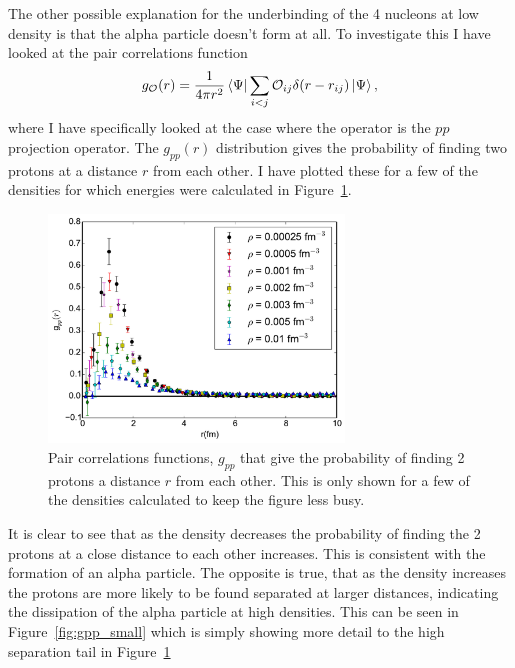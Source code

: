 The other possible explanation for the underbinding of the 4 nucleons at low density is that the alpha particle doesn't form at all. To investigate this I have looked at the pair correlations function
\begin{equation}
   g_\mathcal{O}(r) = \frac{1}{4\pi r^2} \left< \Psi \right|\sum\limits_{i<j}\mathcal{O}_{ij}\delta(r-r_{ij})\left| \Psi \right>,
\end{equation}
where I have specifically looked at the case where the operator is the $pp$ projection operator. The $g_{pp}(r)$ distribution gives the probability of finding two protons at a distance $r$ from each other. I have plotted these for a few of the densities for which energies were calculated in Figure~\ref{fig:gpp}.
\begin{figure}[h!]
   \centering
   \includegraphics[width=0.7\textwidth]{figures/gpp.pdf}
   \caption[Pair Correlations Functions, $g_{pp}$ That Give the Probability of Finding 2 Protons a Distance $r$ from Each Other. This Is Only Shown for a Few of the Densities Calculated to Keep the Figure Less Busy.]{Pair correlations functions, $g_{pp}$ that give the probability of finding 2 protons a distance $r$ from each other. This is only shown for a few of the densities calculated to keep the figure less busy.}
   \label{fig:gpp}
\end{figure}
It is clear to see that as the density decreases the probability of finding the 2 protons at a close distance to each other increases. This is consistent with the formation of an alpha particle. The opposite is true, that as the density increases the protons are more likely to be found separated at larger distances, indicating the dissipation of the alpha particle at high densities. This can be seen in Figure~\ref{fig:gpp_small} which is simply showing more detail to the high separation tail in Figure~\ref{fig:gpp}
